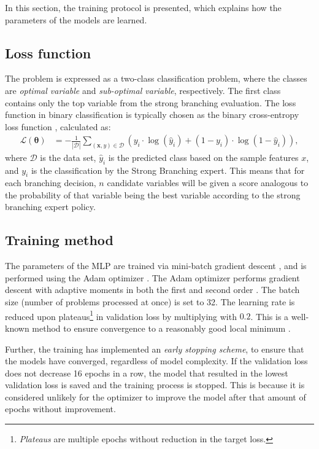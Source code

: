 In this section, the training protocol is presented, which explains how the parameters of the models are learned.


\subsection{Loss function}

The problem is expressed as a two-class classification problem, where the classes are \textit{optimal variable} and \textit{sub-optimal variable}, respectively. The first class contains only the top variable from the strong branching evaluation. The loss function in binary classification is typically chosen as the binary cross-entropy loss function \cite{goodfellow2016deep}, calculated as:
\begin{align}
    \bm{\mathcal{L}}(\bm{\theta}) &= - \frac{1}{|\mathcal{D}|}\sum_{(\bm{x}, y) \in \mathcal{D}} \left( y_i \cdot \log( \hat y_i) + (1-y_i) \cdot \log(1 - \hat y_i) \right),
\end{align}
where $\mathcal{D}$ is the data set, $\hat y_i$ is the predicted class based on the sample features $x$, and $y_i$ is the classification by the Strong Branching expert.  
This means that for each branching decision, $n$ candidate variables will be given a score analogous to the probability of that variable being the best variable according to the strong branching expert policy. 

\subsection{Training method}

The parameters of the \gls{MLP} are trained via mini-batch gradient descent \cite{goodfellow2016deep}, and is performed using 
 the Adam optimizer \cite{kingma2017adam}. The Adam optimizer performs gradient descent with adaptive moments in both the first and second order \cite{kingma2017adam}. 
 The batch size (number of problems processed at once) is set to 32. The learning rate is reduced upon plateaus\footnote{\textit{Plateaus} are multiple epochs without reduction in the target loss.} in validation loss 
 by multiplying with $ 0.2 $. This is a well-known method to ensure convergence to a reasonably good local minimum \cite{goodfellow2016deep}.
 
 Further, the training has implemented an \textit{early stopping scheme}, to ensure that the models have converged, regardless of model complexity. If the validation loss does not decrease 16 epochs in a row, the model that resulted in the lowest validation loss is saved and the training process is stopped. This is because it is considered unlikely for the optimizer to improve the model after that amount of epochs without improvement. 
 
